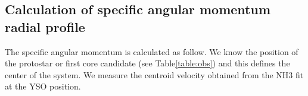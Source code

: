 \subsection{Calculation of specific angular momentum radial profile}
The specific angular momentum is calculated as follow.
We know the position of the protostar or first core candidate (see Table\ref{table:obs}) and this 
defines the center of the system.
We measure the centroid velocity obtained from the NH3 fit at the YSO position. 